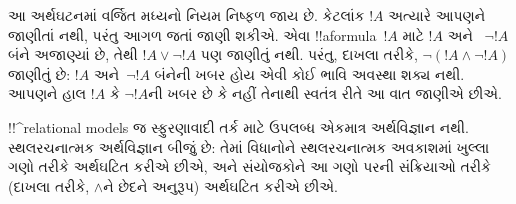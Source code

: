 \documentclass[../../../include/open-logic-section]{subfiles}
\begin{document}
આ અર્થઘટનમાં વર્જિત મધ્યનો નિયમ નિષ્ફળ જાય છે. કેટલાંક
$!A$ અત્યારે આપણને જાણીતાં નથી, પરંતુ આગળ જતાં જાણી
શકીએ. એવા !!a{formula}~$!A$ માટે $!A$ અને
~$\lnot !A$ બંને અજાણ્યાં છે, તેથી $!A \lor \lnot !A$
પણ જાણીતું નથી. પરંતુ, દાખલા તરીકે, $\lnot(!A \land
\lnot !A)$ જાણીતું છે: $!A$ અને~$\lnot !A$ બંનેની
ખબર હોય એવી કોઈ ભાવિ અવસ્થા શક્ય નથી. આપણને હાલ $!A$
કે $\lnot !A$ની ખબર છે કે નહીં તેનાથી સ્વતંત્ર રીતે આ
વાત જાણીએ છીએ.

!!^{relational model}s જ સ્ફુરણાવાદી તર્ક માટે ઉપલબ્ધ
એકમાત્ર અર્થવિજ્ઞાન નથી. સ્થલરચનાત્મક અર્થવિજ્ઞાન બીજું
છે: તેમાં વિધાનોને સ્થલરચનાત્મક અવકાશમાં ખુલ્લા ગણો
તરીકે અર્થઘટિત કરીએ છીએ, અને સંયોજકોને આ ગણો પરની
સંક્રિયાઓ તરીકે (દાખલા તરીકે, $\land$ને છેદને અનુરૂપ)
અર્થઘટિત કરીએ છીએ.
\end{document}
